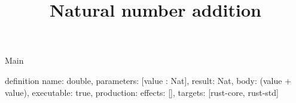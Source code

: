 \begin{lexlean}{Main}
\title{Natural number addition}
\begin{semanticmodule}
definition{
  name: double,
  parameters: [value : Nat],
  result: Nat,
  body: (value + value),
  executable: true,
  production: {effects: [], targets: [rust-core, rust-std]}
}
\end{semanticmodule}
\end{lexlean}
